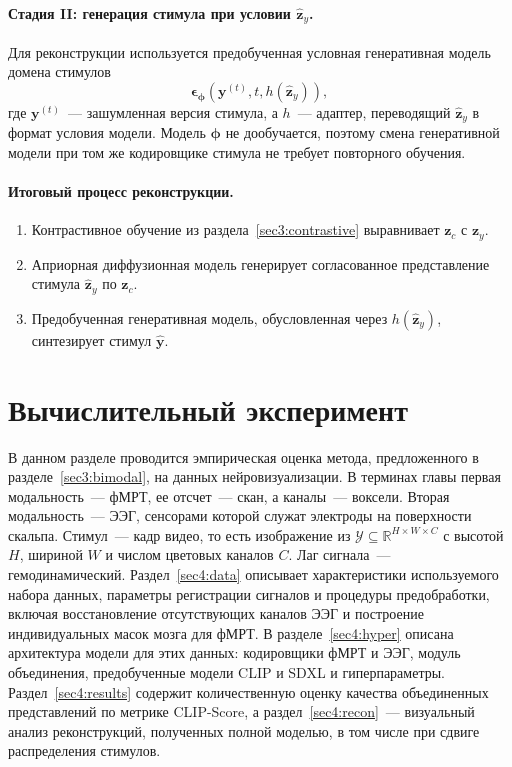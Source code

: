 \paragraph{Стадия II: генерация стимула при условии $\widehat{\mathbf{z}}_y$.}
Для реконструкции используется предобученная условная генеративная модель домена стимулов
\begin{equation*}
\boldsymbol{\epsilon}_{\boldsymbol{\phi}}(\mathbf{y}^{(t)}, t, h(\widehat{\mathbf{z}}_y)),
\end{equation*}
где $\mathbf{y}^{(t)}$~--- зашумленная версия стимула, а $h$~--- адаптер, переводящий $\widehat{\mathbf{z}}_y$ в формат условия модели. Модель $\boldsymbol{\phi}$ не дообучается, поэтому смена генеративной модели при том же кодировщике стимула не требует повторного обучения.

\paragraph{Итоговый процесс реконструкции.}
\begin{enumerate}
    \item Контрастивное обучение из раздела~\ref{sec3:contrastive} выравнивает $\mathbf{z}_c$ с $\mathbf{z}_y$.
    \item Априорная диффузионная модель генерирует согласованное представление стимула $\widehat{\mathbf{z}}_y$ по $\mathbf{z}_c$.
    \item Предобученная генеративная модель, обусловленная через $h(\widehat{\mathbf{z}}_y)$, синтезирует стимул $\widehat{\mathbf{y}}$.
\end{enumerate}

\section{Вычислительный эксперимент}\label{sec4:bimodal}
В данном разделе проводится эмпирическая оценка метода, предложенного в разделе~\ref{sec3:bimodal}, на данных нейровизуализации. В терминах главы первая модальность~--- фМРТ, ее отсчет~--- скан, а каналы~--- воксели. Вторая модальность~--- ЭЭГ, сенсорами которой служат электроды на поверхности скальпа. Стимул~--- кадр видео, то есть изображение из $\mathcal{Y} \subseteq \mathbb{R}^{H \times W \times C}$ с высотой $H$, шириной $W$ и числом цветовых каналов $C$. Лаг сигнала~--- гемодинамический. Раздел~\ref{sec4:data} описывает характеристики используемого набора данных, параметры регистрации сигналов и процедуры предобработки, включая восстановление отсутствующих каналов ЭЭГ и построение индивидуальных масок мозга для фМРТ. В разделе~\ref{sec4:hyper} описана архитектура модели для этих данных: кодировщики фМРТ и ЭЭГ, модуль объединения, предобученные модели CLIP и SDXL и гиперпараметры. Раздел~\ref{sec4:results} содержит количественную оценку качества объединенных представлений по метрике CLIP-Score, а раздел~\ref{sec4:recon}~--- визуальный анализ реконструкций, полученных полной моделью, в том числе при сдвиге распределения стимулов.
